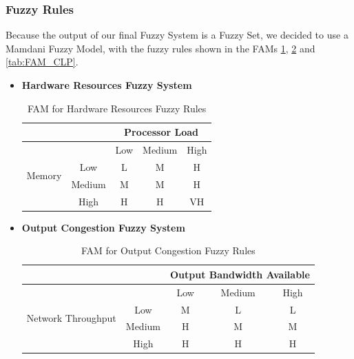 \subsubsection{Fuzzy Rules}
Because the output of our final Fuzzy System is a Fuzzy Set, we decided to use a Mamdani Fuzzy Model, with the fuzzy rules shown in the FAMs \ref{tab:FAM_HDR}, \ref{tab:FAM_OUTC} and \ref{tab:FAM_CLP}.
\begin{itemize}
    \item \textbf{Hardware Resources Fuzzy System}
    \begin{table}[!htb]
        \begin{center}
            \begin{tabular}{ |c|c|c|c|c| }
                \hline
                & & \multicolumn{3}{c|}{Processor Load} \\
                \hline
                \multirow{4}{4em}{Memory}
                &        & Low   & Medium & High\\
                & Low    & L     & M      & H   \\
                & Medium & M     & M      & H   \\
                & High   & H     & H      & VH   \\
                \hline
            \end{tabular}
            \caption{FAM for Hardware Resources Fuzzy Rules}
            \label{tab:FAM_HDR}
        \end{center}
    \end{table}

    \item \textbf{Output Congestion Fuzzy System}
    \begin{table}[!htb]
        \begin{center}
            \begin{tabular}{ |c|c|c|c|c| }
                \hline
                & & \multicolumn{3}{c|}{Output Bandwidth Available} \\
                \hline
                \multirow{4}{4em}{Network Throughput}
                &        & Low   & Medium & High \\
                & Low    & M     & L      & L    \\
                & Medium & H     & M      & M    \\
                & High   & H     & H      & H    \\
                \hline
            \end{tabular}
            \caption{FAM for Output Congestion Fuzzy Rules}
            \label{tab:FAM_OUTC}
        \end{center}
    \end{table}


\end{itemize}
